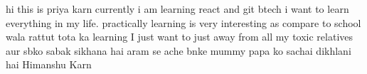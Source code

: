 hi this is priya karn
currently i am learning react and git
btech 
i want to learn everything in my life. practically learning is very interesting as compare to school wala rattut tota ka learning
I just want to just away from all my toxic relatives aur sbko sabak sikhana hai aram se ache bnke mummy papa ko sachai dikhlani hai
Himanshu Karn
